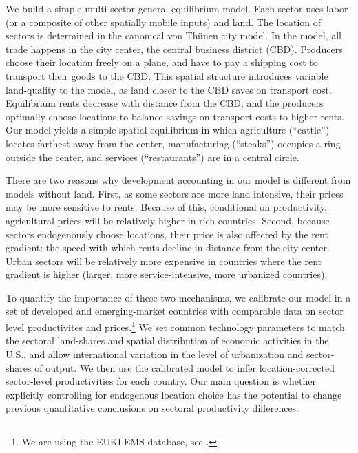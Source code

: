 \documentclass[12pt]{article}
\begin{document}
We build a simple multi-sector general equilibrium model. Each sector uses labor (or a composite of other spatially mobile inputs) and land. The location of sectors is determined in the canonical von Thünen city model. In the model, all trade happens in the city center, the central business district (CBD). Producers choose their location freely on a plane, and have to pay a shipping cost to transport their goods to the CBD. This spatial structure introduces variable land-quality to the model, as land closer to the CBD saves on transport cost. Equilibrium rents decrease with distance from the CBD, and the producers optimally choose locations to balance savings on transport costs to higher rents.
Our model yields a simple spatial equilibrium in which agriculture (``cattle'') locates farthest away from the center, manufacturing (``steaks'') occupies a ring outside the center, and services (``restaurants'') are in a central circle.

There are two reasons why development accounting in our model is different from models without land. First, as some sectors are more land intensive, their prices may be more sensitive to rents. Because of this, conditional on productivity, agricultural prices will be relatively higher in rich countries. Second, because sectors endogenously choose locations, their price is also affected by the rent gradient: the speed with which rents decline in distance from the city center. Urban sectors will be relatively more expensive in countries where the rent gradient is higher (larger, more service-intensive, more urbanized countries).

To quantify the importance of these two mechanisms, we calibrate our model in a set of developed and emerging-market countries with comparable data on sector level productivites and prices.\footnote{We are using the EUKLEMS database, see .} We set common technology parameters to match the sectoral land-shares and spatial distribution of economic activities in the U.S., and allow international variation in the level of urbanization and sector-shares of output. We then use the calibrated model to infer location-corrected sector-level productivities for each country. Our main question is whether explicitly controlling for endogenous location choice has the potential to change previous quantitative conclusions on sectoral productivity differences. %
\end{document}
